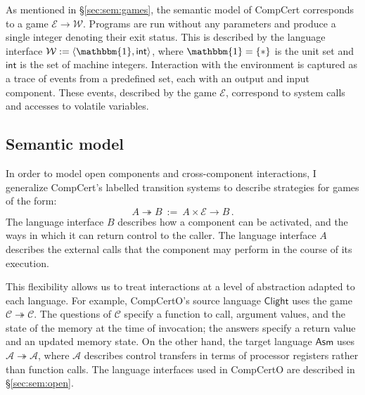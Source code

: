 \documentclass[11pt,oneside]{book}
\theoremstyle{definition}
\newcommand{\kw}[1]{\ensuremath{ \mathsf{#1} }}
\begin{document}
As mentioned in \S\ref{sec:sem:games},
the semantic model of CompCert corresponds to
a game $\mathcal{E} \rightarrow \mathcal{W}$.
Programs are run without any parameters
and produce a single integer denoting their exit status.
This is described by the language interface
$\mathcal{W} := \langle \mathbbm{1}, \kw{int} \rangle$,
where $\mathbbm{1} = \{ * \}$ is the unit set
and $\kw{int}$ is the set of machine integers.
Interaction with the environment
is captured as a trace of events from a predefined set,
each with an output and input component.
These events,
described by the game $\mathcal{E}$,
correspond to system calls and accesses to volatile variables.


\subsection{Semantic model} %

In order to model open components and cross-component interactions,
I generalize CompCert's labelled transition systems
to describe strategies for games of the form:
\[ A \twoheadrightarrow B \: := \:
   A \times \mathcal{E} \rightarrow B \,. \]
The language interface $B$ describes how a component can be activated,
and the ways in which it can return control to the caller.
The language interface $A$ describes the external calls that the component
may perform in the course of its execution.

This flexibility allows us to treat interactions
at a level of abstraction adapted to each language.
For example, CompCertO's source language \kw{Clight} uses the game
\mbox{$\mathcal{C} \twoheadrightarrow \mathcal{C}$}.
The questions of $\mathcal{C}$ specify a function to call,
argument values,
and the state of the memory at the time of invocation;
the answers specify a return value and an updated memory state.
On the other hand, the target language \kw{Asm} uses
$\mathcal{A} \twoheadrightarrow \mathcal{A}$,
where $\mathcal{A}$ describes control transfers
in terms of processor registers
rather than function calls.
The language interfaces used in CompCertO
are described in \S\ref{sec:sem:open}.

\end{document}
